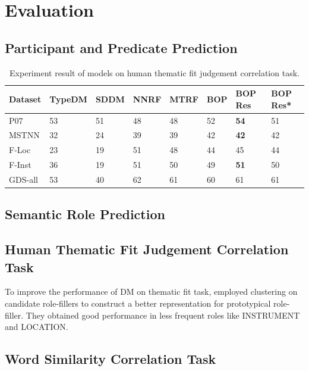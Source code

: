 \documentclass[a4paper]{article}
\begin{document}
\newpage
\section{Evaluation}  \label{sec:evaluation}
\subsection{Participant and Predicate Prediction}  \label{sec:wordprediction}


\begin{table}[t]
\centering
\begin{tabular}{l|l|l||l|l|l|l||l}
Dataset &   TypeDM  &   SDDM    &   NNRF    &   MTRF    &   BOP &   BOP Res     &   BOP Res*    \\ \hline
P07     &   53      &   51      &   48      &   48      &   52  &   \textbf{54} &   51          \\
MSTNN   &   32      &   24      &   39      &   39      &   42  &   \textbf{42} &   42          \\
F-Loc   &   23      &   19      &   51      &   48      &   44  &   45          &   44          \\
F-Inst  &   36      &   19      &   51      &   50      &   49  &   \textbf{51} &   50          \\
GDS-all &   53      &   40      &   62      &   61      &   60  &   61          &   61          \\
\end{tabular}
\caption{\label{tab:widgets} Experiment result of models on human thematic fit judgement correlation task.}
\end{table}


\subsection{Semantic Role Prediction}  \label{sec:roleprediction}

\subsection{Human Thematic Fit Judgement Correlation Task}  \label{sec:thematicfit}
To improve the performance of DM on thematic fit task, \citet{greenberg2015improving} employed clustering on candidate role-fillers to construct a better representation for prototypical role-filler. They obtained good performance in less frequent roles like INSTRUMENT and LOCATION. 

\subsection{Word Similarity Correlation Task}  \label{sec:wordsim}
\end{document}

